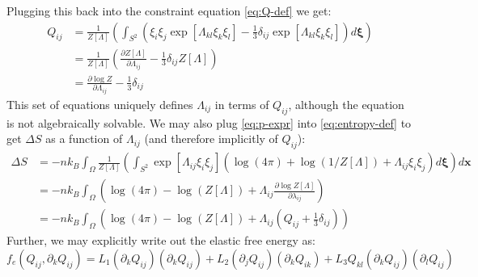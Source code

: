 \documentclass[reqno]{article}
\begin{document}
	Plugging this back into the constraint equation \eqref{eq:Q-def} we get:
	\begin{equation}
	\begin{split}
		Q_{ij} 
		&= \frac{1}{Z[\Lambda]} \left( 
		\int_{S^2} \left( \xi_i \xi_j \exp[\Lambda_{kl} \xi_k \xi_l]
		- \tfrac13 \delta_{ij} \exp[\Lambda_{kl} \xi_k \xi_l] \right)
		d \mathbf{\xi} \right) \\
		&= \frac{1}{Z[\Lambda]} \left(
		\frac{\partial Z[\Lambda]}{\partial \Lambda_{ij}} - \tfrac13 \delta_{ij} Z[\Lambda]
		\right) \\
		&= \frac{\partial \log Z}{\partial \Lambda_{ij}} - \tfrac13 \delta_{ij}
	\end{split}
	\end{equation}
	This set of equations uniquely defines $\Lambda_{ij}$ in terms of $Q_{ij}$, although the equation is not algebraically solvable.
	We may also plug \eqref{eq:p-expr} into \eqref{eq:entropy-def} to get $\Delta S$ as a function of $\Lambda_{ij}$ (and therefore implicitly of $Q_{ij}$):
	\begin{equation}
	\begin{split}
		\Delta S
		&= -n k_B \int_{\Omega} \frac{1}{Z[\Lambda]} \left(
		\int_{S^2} \exp[\Lambda_{ij} \xi_i \xi_j]
		\left(\log(4\pi) + \log(1 / Z[\Lambda]) + \Lambda_{ij} \xi_i \xi_j\right) d \mathbf{\xi}
		\right) d\mathbf{x} \\
		&= -n k_B \int_{\Omega} \left(
		\log(4 \pi) - \log(Z[\Lambda])
		+ \Lambda_{ij} \frac{\partial \log Z[\Lambda]}{\partial \lambda_{ij}}
		\right) \\
		&= -n k_B \int_{\Omega} \left(
		\log(4 \pi) - \log(Z[\Lambda])
		+ \Lambda_{ij} \left( Q_{ij} + \tfrac13	 \delta_{ij} \right)
		\right)
	\end{split}
	\end{equation}
	Further, we may explicitly write out the elastic free energy as:
	\begin{equation}
		f_e (Q_{ij}, \partial_k Q_{ij})
		= L_1 \left(\partial_k Q_{ij}\right) \left(\partial_k Q_{ij}\right)
		+ L_2 \left(\partial_j Q_{ij}\right) \left(\partial_k Q_{ik}\right)
		+ L_3 Q_{kl} \left(\partial_k Q_{ij}\right) \left(\partial_l Q_{ij}\right)
	\end{equation}
	
\end{document}
